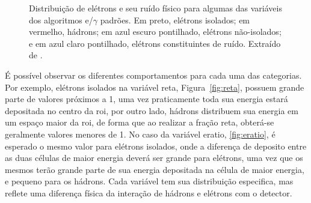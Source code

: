 \begin{figure}
{        }
\caption[Distribuição de elétrons e seu ruído físico para algumas das variáveis
dos algoritmos e/$\gamma$ padrões.]
{Distribuição de elétrons e seu ruído físico para algumas das variáveis
dos algoritmos e/$\gamma$ padrões. Em preto, elétrons isolados; em vermelho,
hádrons; em azul escuro pontilhado, elétrons não-isolados; e em azul claro
pontilhado, elétrons constituintes de ruído. Extraído de \cite{expected_perf_2011}.}
\label{fig:cortes_egamma_padrao}
\end{figure}

É possível observar os diferentes comportamentos para cada uma das
categorias. Por exemplo, elétrons isolados na variável \gls{reta},
Figura~\ref{fig:reta}, possuem grande parte de valores próximos a 1, 
uma vez praticamente toda sua energia estará depositada no centro da 
\gls{roi}, por outro lado, hádrons distribuem sua energia em um espaço maior da
\gls{roi}, de forma que ao realizar a fração \gls{reta}, obterá-se geralmente
valores menores de 1. No caso da variável
\gls{eratio}, \ref{fig:eratio}, é esperado o mesmo valor para elétrons isolados,
onde a diferença de deposito entre as duas células de maior
energia deverá ser grande para elétrons, uma vez que os mesmos terão grande parte 
de sua energia depositada na célula de maior energia, e pequeno para os hádrons. Cada variável
tem sua distribuição especifica, mas reflete uma diferença física da interação
de hádrons e elétrons com o detector.


